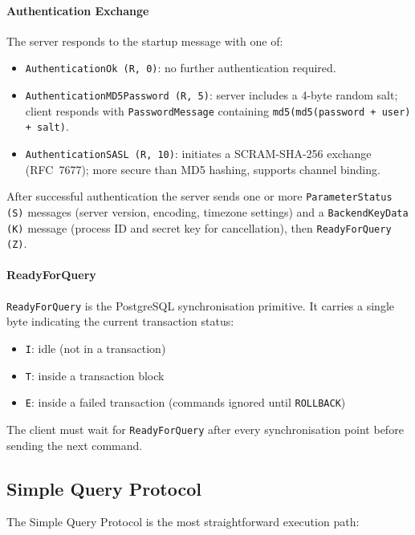 \paragraph{Authentication Exchange}

The server responds to the startup message with one of:
\begin{itemize}
    \item \texttt{AuthenticationOk (R, 0)}: no further authentication required.
    \item \texttt{AuthenticationMD5Password (R, 5)}: server includes a 4-byte random salt; client responds with \texttt{PasswordMessage} containing \texttt{md5(md5(password + user) + salt)}.
    \item \texttt{AuthenticationSASL (R, 10)}: initiates a SCRAM-SHA-256 exchange (RFC~7677); more secure than MD5 hashing, supports channel binding.
\end{itemize}

After successful authentication the server sends one or more \texttt{ParameterStatus (S)} messages (server version, encoding, timezone settings) and a \texttt{BackendKeyData (K)} message (process ID and secret key for cancellation), then \texttt{ReadyForQuery (Z)}.

\paragraph{ReadyForQuery}

\texttt{ReadyForQuery} is the PostgreSQL synchronisation primitive. It carries a single byte indicating the current transaction status:
\begin{itemize}
    \item \texttt{I}: idle (not in a transaction)
    \item \texttt{T}: inside a transaction block
    \item \texttt{E}: inside a failed transaction (commands ignored until \texttt{ROLLBACK})
\end{itemize}
The client must wait for \texttt{ReadyForQuery} after every synchronisation point before sending the next command.

\subsection{Simple Query Protocol}

The Simple Query Protocol is the most straightforward execution path:

